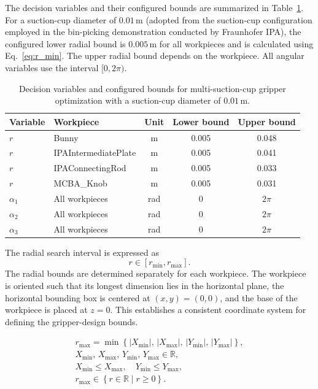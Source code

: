 The decision variables and their configured bounds are summarized in
Table~\ref{tab:multi_sc_variables}. For a suction-cup diameter of
$0.01\,\mathrm{m}$ (adopted from the suction-cup configuration
employed in the bin-picking demonstration conducted by Fraunhofer IPA), 
the configured lower radial bound is
$0.005\,\mathrm{m}$ for all workpieces and is calculated using Eq.~\ref{eq:r_min}. The upper radial bound depends on
the workpiece. All angular variables use the interval $[0,2\pi)$.

\begin{table}[htbp]
\centering
\caption{Decision variables and configured bounds for multi-suction-cup
gripper optimization with a suction-cup diameter of $0.01\,\mathrm{m}$.}
\label{tab:multi_sc_variables}
\begin{tabular}{@{}llccc@{}}
\toprule
\textbf{Variable} & \textbf{Workpiece} & \textbf{Unit}
& \textbf{Lower bound} & \textbf{Upper bound} \\
\midrule
$r$        & Bunny                & m   & 0.005 & 0.048 \\
$r$        & IPAIntermediatePlate & m   & 0.005 & 0.041 \\
$r$        & IPAConnectingRod     & m   & 0.005 & 0.033 \\
$r$        & MCBA\_Knob           & m   & 0.005 & 0.031 \\
\midrule
$\alpha_1$ & All workpieces       & rad & 0     & $2\pi$ \\
$\alpha_2$ & All workpieces       & rad & 0     & $2\pi$ \\
$\alpha_3$ & All workpieces       & rad & 0     & $2\pi$ \\
\bottomrule
\end{tabular}
\end{table}

The radial search interval is expressed as
\begin{equation}
    r \in [r_{\min},r_{\max}].
\end{equation}
The radial bounds are determined separately for each workpiece.
The workpiece is oriented such that its longest dimension lies in the
horizontal plane, the horizontal bounding box is centered at
$(x,y)=(0,0)$, and the base of the workpiece is placed at $z=0$.
This establishes a consistent coordinate system for defining the
gripper-design bounds.

\begin{equation}
    \begin{gathered}
        r_{\max}
        =
        \min
        \left\{
            |X_{\min}|,\,
            |X_{\max}|,\,
            |Y_{\min}|,\,
            |Y_{\max}|
        \right\},
        \\[4pt]
        X_{\min},\, X_{\max},\, Y_{\min},\, Y_{\max} \in \mathbb{R},
        \\[2pt]
        X_{\min} \le X_{\max},
        \quad
        Y_{\min} \le Y_{\max},
        \\[2pt]
        r_{\max} \in \left\{ r \in \mathbb{R} \mid r \ge 0 \right\}.
    \end{gathered}
\end{equation}

